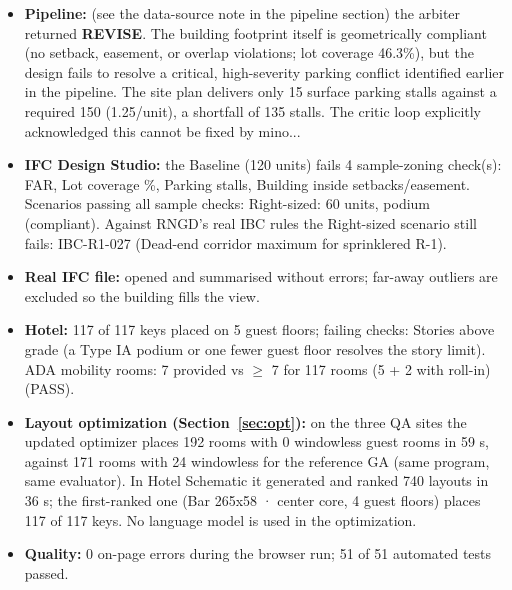 \documentclass[10pt]{article}
\begin{document}
\begin{itemize}
\item \textbf{Pipeline:} (see the data-source note in the pipeline section) the arbiter returned \textbf{REVISE}. The building footprint itself is geometrically compliant (no setback, easement, or overlap violations; lot coverage 46.3\%), but the design fails to resolve a critical, high-severity parking conflict identified earlier in the pipeline. The site plan delivers only 15 surface parking stalls against a required 150 (1.25/unit), a shortfall of 135 stalls. The critic loop explicitly acknowledged this cannot be fixed by mino...
\item \textbf{IFC Design Studio:} the Baseline (120 units) fails 4 sample-zoning check(s): FAR, Lot coverage \%, Parking stalls, Building inside setbacks/easement. Scenarios passing all sample checks: Right-sized: 60 units, podium (compliant). Against RNGD's real IBC rules the Right-sized scenario still fails: IBC-R1-027 (Dead-end corridor maximum for sprinklered R-1).
\item \textbf{Real IFC file:} opened and summarised without errors; far-away outliers are excluded so the building fills the view.
\item \textbf{Hotel:} 117 of 117 keys placed on 5 guest floors; failing checks: Stories above grade (a Type IA podium or one fewer guest floor resolves the story limit). ADA mobility rooms: 7 provided vs $\ge$ 7 for 117 rooms (5 + 2 with roll-in) (PASS).
\item \textbf{Layout optimization (Section~\ref{sec:opt}):} on the three QA sites the updated optimizer places 192 rooms with 0 windowless guest rooms in 59 s, against 171 rooms with 24 windowless for the reference GA (same program, same evaluator). In Hotel Schematic it generated and ranked 740 layouts in 36 s; the first-ranked one (Bar 265x58 · center core, 4 guest floors) places 117 of 117 keys. No language model is used in the optimization.
\item \textbf{Quality:} 0 on-page errors during the browser run; 51 of 51 automated tests passed.
\end{itemize}
\end{document}
